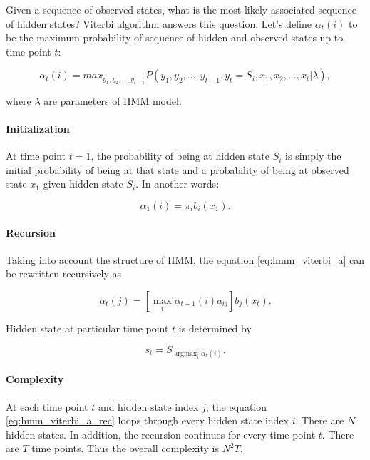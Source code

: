 \documentclass[thesis=B,english]{FITthesis}[2012/06/26]
\DeclareMathOperator*{\argmax}{argmax} %
\begin{document}
Given a sequence of observed states, what is the most likely associated sequence of hidden states? Viterbi algorithm answers this question. Let's define $\alpha_t(i)$ to be the maximum probability of sequence of hidden and observed states up to time point $t$:

\begin{equation} \label{eq:hmm_viterbi_a}
\alpha_t(i) = max_{y_1,y_2,\dots,y_{t-1}} P(y_1,y_2,\dots,y_{t-1},y_t = S_i,x_1,x_2,\dots,x_t | \lambda),
\end{equation}

where $\lambda$ are parameters of HMM model.

\paragraph{Initialization}

At time point $t=1$, the probability of being at hidden state $S_i$ is simply the initial probability of being at that state and a probability of being at observed state $x_1$ given hidden state $S_i$. In another words:

\begin{equation}
\alpha_1(i) = \pi_i b_i(x_1).
\end{equation}

\paragraph{Recursion}
Taking into account the structure of HMM, the equation \ref{eq:hmm_viterbi_a} can be rewritten recursively as

\begin{equation} \label{eq:hmm_viterbi_a_rec}
\alpha_t(j) = [\max_i \alpha_{t-1}(i)a_{ij}] b_j(x_t).
\end{equation}

Hidden state at particular time point $t$ is determined by

\begin{equation}
s_t = S_{\argmax_i \alpha_{t}(i)}.
\end{equation}

\paragraph{Complexity}

At each time point $t$ and hidden state index $j$, the equation \ref{eq:hmm_viterbi_a_rec} loops through every hidden state index $i$. There are $N$ hidden states. In addition, the recursion continues for every time point $t$. There are $T$ time points. Thus the overall complexity is
$N^2 T$.
\end{document}
